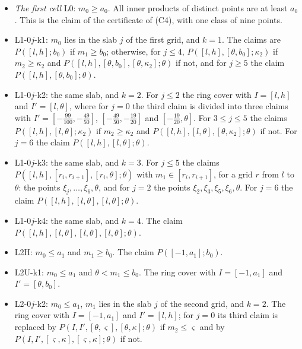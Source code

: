 \documentclass[reqno,a4paper,11pt]{amsart}
\numberwithin{equation}{section}
\begin{document}
\begin{itemize}
    \item \emph{The first cell} \textup{L0}: $m_0 \geq a_0$. All inner products of distinct points are at least $a_0$. This is the claim of the certificate of (C4), with one class of nine points.
    \item \textup{L1-0$j$-k1}: $m_0$ lies in the slab $j$ of the first grid, and $k = 1$. The claims are $P([l,h]; b_0)$ if $m_1 \geq b_0$; otherwise, for $j \leq 4$, $P([l,h],\allowbreak[\theta,b_0]; \kappa_2)$ if $m_2 \geq \kappa_2$ and $P([l,h],\allowbreak[\theta,b_0],\allowbreak[\theta,\kappa_2]; \theta)$ if not, and for $j \geq 5$ the claim $P([l,h],\allowbreak[\theta,b_0]; \theta)$.
    \item \textup{L1-0$j$-k2}: the same slab, and $k = 2$. For $j \leq 2$ the ring cover with $I = [l,h]$ and $I' = [l,\theta]$, where for $j = 0$ the third claim is divided into three claims with $I' = [-\tfrac{99}{100}, -\tfrac{49}{50}]$, $[-\tfrac{49}{50}, -\tfrac{19}{20}]$ and $[-\tfrac{19}{20}, \theta]$. For $3 \leq j \leq 5$ the claims $P([l,h],\allowbreak[l,\theta]; \kappa_2)$ if $m_2 \geq \kappa_2$ and $P([l,h],\allowbreak[l,\theta],\allowbreak[\theta,\kappa_2]; \theta)$ if not. For $j = 6$ the claim $P([l,h],\allowbreak[l,\theta]; \theta)$.
    \item \textup{L1-0$j$-k3}: the same slab, and $k = 3$. For $j \leq 5$ the claims $P([l,h],\allowbreak[r_i,r_{i+1}],\allowbreak[r_i,\theta]; \theta)$ with $m_1 \in [r_i, r_{i+1}]$, for a grid $r$ from $l$ to $\theta$: the points $\xi_j, \dots, \xi_6, \theta$, and for $j = 2$ the points $\xi_2, \xi_3, \xi_5, \xi_6, \theta$. For $j = 6$ the claim $P([l,h],\allowbreak[l,\theta],\allowbreak[l,\theta]; \theta)$.
    \item \textup{L1-0$j$-k4}: the same slab, and $k = 4$. The claim $P([l,h],\allowbreak[l,\theta],\allowbreak[l,\theta],\allowbreak[l,\theta]; \theta)$.
    \item \textup{L2H}: $m_0 \leq a_1$ and $m_1 \geq b_0$. The claim $P([-1,a_1]; b_0)$.
    \item \textup{L2U-k1}: $m_0 \leq a_1$ and $\theta < m_1 \leq b_0$. The ring cover with $I = [-1,a_1]$ and $I' = [\theta,b_0]$.
    \item \textup{L2-0$j$-k2}: $m_0 \leq a_1$, $m_1$ lies in the slab $j$ of the second grid, and $k = 2$. The ring cover with $I = [-1,a_1]$ and $I' = [l,h]$; for $j = 0$ its third claim is replaced by $P(I,I',[\theta,\varsigma],\allowbreak[\theta,\kappa]; \theta)$ if $m_2 \leq \varsigma$ and by $P(I,I',[\varsigma,\kappa],\allowbreak[\varsigma,\kappa]; \theta)$ if not.

\end{itemize}
\end{document}
